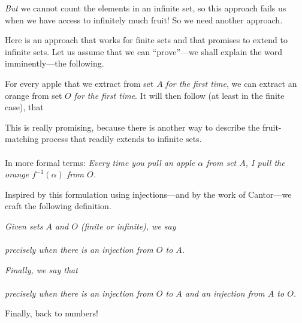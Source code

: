 \noindent
{\em But} we cannot count the elements in an infinite set, so this
approach fails us when we have access to infinitely much fruit!  So we
need another approach.

\medskip

Here is an approach that works for finite sets and that promises to
extend to infinite sets.  Let us assume that we can ``prove''---we
shall explain the word imminently---the following.

For every apple that we extract from set $A$ {\em for the first time},
we can extract an orange from set $O$ {\em for the first time}.  It
will then follow (at least in the finite case), that \\
\hspace*{.35in}{\em There are at least as many oranges as apples!}

\noindent
This is really promising, because there is another way to describe the
fruit-matching process that readily extends to infinite sets.  \\
 \\
In more formal terms: {\em Every time you pull an apple $\alpha$ from set
  $A$, I pull the orange $f^{-1}(\alpha)$ from $O$.}

\medskip

Inspired by this formulation using injections---and by the work of
Cantor---we craft the following definition.

\noindent
{\em
Given sets $A$ and $O$ (finite or infinite), we say \\
\hspace*{.35in}{\em Set $O$ is at least as big as set $A$, denoted
  $|O| \geq |A|$} \\
precisely when there is an injection from $O$ to $A$.}

\noindent
{\em
Finally, we say that \\
\hspace*{.35in}{\em Sets $O$ and $A$ have the same cardinality,
  denoted $|O| = |A|$} \\
precisely when there is an injection from $O$ to $A$ {\em and} an
injection from $A$ to $O$.}

\medskip

Finally, back to numbers!

